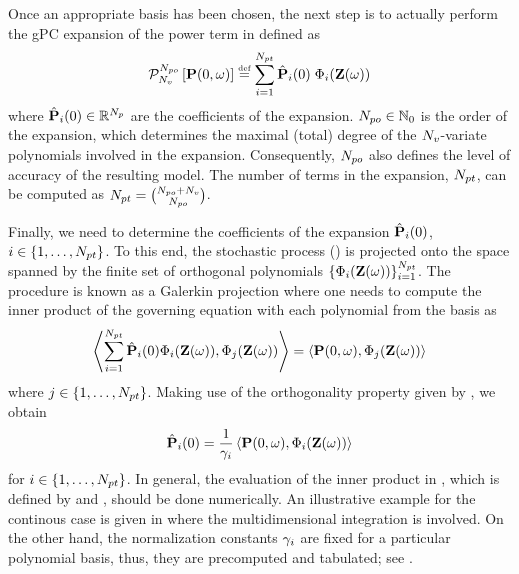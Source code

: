 Once an appropriate basis has been chosen, the next step is to actually perform the gPC expansion of the power term in  defined as
\begin{equation} \elabel{pc-expansion}
  \oPC{\vars}{\pcorder}{\vP(0, \o)} \eqdef \sum_{i = 1}^{\pcterms} \pcc{\vP}_i(0) \; \pcb_i(\vZ(\o))
\end{equation}
where $\hat{\mathbf{P}}_i(0) \in \mathbb{R}^{N_p}$ are the coefficients of the expansion. ${N_{po}} \in \mathbb{N}_{0}$ is the order of the expansion, which determines the maximal (total) degree of the ${N_v}$-variate polynomials involved in the expansion. Consequently, ${N_{po}}$ also defines the level of accuracy of the resulting model. The number of terms in the expansion, ${N_{pt}}$, can be computed as ${N_{pt}} = {{N_{po}} + {N_v} \choose {N_{po}}}$.

Finally, we need to determine the coefficients of the expansion $\hat{\mathbf{P}}_i(0)$, $i \in \{ 1, \dotsc, {N_{pt}} \}$. To this end, the stochastic process () is projected onto the space spanned by the finite set of orthogonal polynomials $\{ \Phi_i(\mathbf{Z}(\omega)) \}_{i = 1}^{{N_{pt}}}$. The procedure is known as a Galerkin projection where one needs to compute the inner product of the governing equation  with each polynomial from the basis as
\[
  \oInner{\sum_{i=1}^{\pcterms} \pcc{\vP}_i(0) \pcb_i(\vZ(\o))}{\pcb_j(\vZ(\o))} = \oInner{\vP(0, \o)}{\pcb_j(\vZ(\o))}
\]
where $j \in \{ 1, \dotsc, {N_{pt}} \}$. Making use of the orthogonality property given by , we obtain
\begin{equation} \elabel{pc-coefficients}
  \pcc{\vP}_i(0) = \frac{1}{\pcn_i} \oInner{\vP(0, \o)}{\pcb_i(\vZ(\o))}
\end{equation}
for $i \in \{ 1, \dotsc, {N_{pt}} \}$. In general, the evaluation of the inner product in , which is defined by  and , should be done numerically. An illustrative example for the continous case is given in  where the multidimensional integration is involved. On the other hand, the normalization constants $\gamma_i$ are fixed for a particular polynomial basis, thus, they are precomputed and tabulated; see \cite{ghanem1991}.

